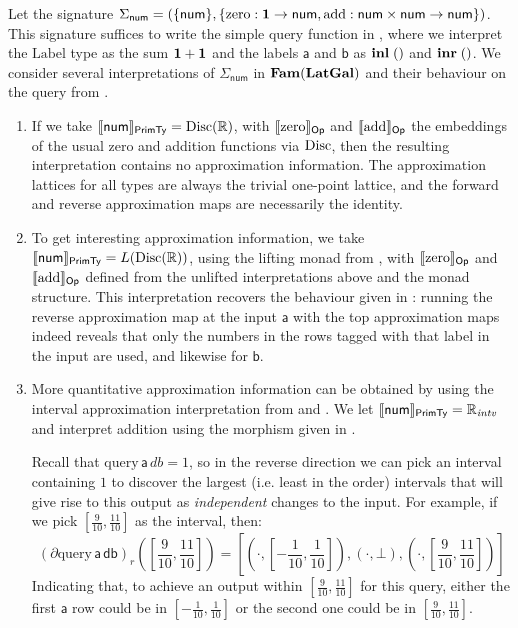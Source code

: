 Let the signature
$\Sigma_{\mathsf{num}} = (\{\mathsf{num}\}, \{\mathrm{zero} : \mathbf{1} \to \mathsf{num}, \mathrm{add} :
\mathsf{num} \times \mathsf{num} \to \mathsf{num}\})$. This signature suffices to write the simple query
function in , where we interpret the $\mathrm{Label}$ type as the sum
$\mathbf{1} + \mathbf{1}$ and the labels $\mathsf{a}$ and $\mathsf{b}$ as $\mathbf{inl}\;()$ and
$\mathbf{inr}\;()$. We consider several interpretations of $\Sigma_{\mathsf{num}}$ in $\mathbf{Fam}(\mathbf{LatGal})$ and their
behaviour on the query from .
\begin{enumerate}
\item If we take $\llbracket \mathsf{num} \rrbracket_{\mathsf{PrimTy}} = \mathrm{Disc}(\mathbb{R})$, with $\llbracket \mathrm{zero} \rrbracket_{\mathsf{Op}}$ and
  $\llbracket \mathrm{add} \rrbracket_{\mathsf{Op}}$ the embeddings of the usual zero and addition functions via $\mathrm{Disc}$, then the
  resulting interpretation contains no approximation information. The approximation lattices for all types are
  always the trivial one-point lattice, and the forward and reverse approximation maps are necessarily the
  identity.
\item To get interesting approximation information, we take
  $\llbracket \mathsf{num} \rrbracket_{\mathsf{PrimTy}} = L(\mathrm{Disc}(\mathbb{R}))$, using the lifting monad from
  , with $\llbracket \mathrm{zero} \rrbracket_{\mathsf{Op}}$ and
  $\llbracket \mathrm{add} \rrbracket_{\mathsf{Op}}$ defined from the unlifted interpretations above and the monad structure. This
  interpretation recovers the behaviour given in : running the reverse
  approximation map at the input $\mathsf{a}$ with the top approximation maps indeed reveals that only the
  numbers in the rows tagged with that label in the input are used, and likewise for $\mathsf{b}$.
\item More quantitative approximation information can be obtained by using the interval approximation
  interpretation from  and . We let
  $\llbracket \mathsf{num} \rrbracket_{\mathsf{PrimTy}} = \mathbb{R}_{\mathit{intv}}$ and interpret addition using the morphism given
  in .

  Recall that $\mathrm{query}\,\mathsf{a}\,\mathit{db} = 1$, so in the reverse direction we can pick an
  interval containing $1$ to discover the largest (i.e. least in the order) intervals that will give rise to
  this output as \emph{independent} changes to the input. For example, if we pick
  $[\frac{9}{10},\frac{11}{10}]$ as the interval, then:
  \begin{displaymath}
    (\partial\mathrm{query}\,\mathsf{a}\,\mathsf{db})_r([\frac{9}{10},\frac{11}{10}]) = [(\cdot,[-\frac{1}{10},\frac{1}{10}]),(\cdot,\bot),(\cdot,[\frac{9}{10},\frac{11}{10}])]
  \end{displaymath}
  Indicating that, to achieve an output within $[\frac{9}{10},\frac{11}{10}]$ for this query, either the first
  $\mathsf{a}$ row could be in $[-\frac{1}{10},\frac{1}{10}]$ or the second one could be in
  $[\frac{9}{10},\frac{11}{10}]$.
\end{enumerate}

